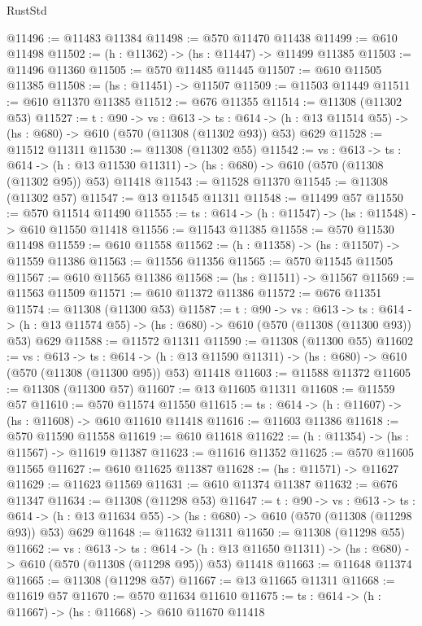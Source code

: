 \begin{lexlean}{RustStd}
\begin{coremodule}
@11496 := @11483 @11384
@11498 := @570 @11470 @11438
@11499 := @610 @11498
@11502 := (h : @11362) -> (hs : @11447) -> @11499 @11385
@11503 := @11496 @11360
@11505 := @570 @11485 @11445
@11507 := @610 @11505 @11385
@11508 := (hs : @11451) -> @11507
@11509 := @11503 @11449
@11511 := @610 @11370 @11385
@11512 := @676 @11355
@11514 := @11308 (@11302 @53)
@11527 := {t : @90} ->
  {vs : @613} ->
  {ts : @614} -> (h : @13 @11514 @55) -> (hs : @680) -> @610 (@570 (@11308 (@11302 @93)) @53) @629
@11528 := @11512 @11311
@11530 := @11308 (@11302 @55)
@11542 := {vs : @613} ->
  {ts : @614} ->
  (h : @13 @11530 @11311) -> (hs : @680) -> @610 (@570 (@11308 (@11302 @95)) @53) @11418
@11543 := @11528 @11370
@11545 := @11308 (@11302 @57)
@11547 := @13 @11545 @11311
@11548 := @11499 @57
@11550 := @570 @11514 @11490
@11555 := {ts : @614} -> (h : @11547) -> (hs : @11548) -> @610 @11550 @11418
@11556 := @11543 @11385
@11558 := @570 @11530 @11498
@11559 := @610 @11558
@11562 := (h : @11358) -> (hs : @11507) -> @11559 @11386
@11563 := @11556 @11356
@11565 := @570 @11545 @11505
@11567 := @610 @11565 @11386
@11568 := (hs : @11511) -> @11567
@11569 := @11563 @11509
@11571 := @610 @11372 @11386
@11572 := @676 @11351
@11574 := @11308 (@11300 @53)
@11587 := {t : @90} ->
  {vs : @613} ->
  {ts : @614} -> (h : @13 @11574 @55) -> (hs : @680) -> @610 (@570 (@11308 (@11300 @93)) @53) @629
@11588 := @11572 @11311
@11590 := @11308 (@11300 @55)
@11602 := {vs : @613} ->
  {ts : @614} ->
  (h : @13 @11590 @11311) -> (hs : @680) -> @610 (@570 (@11308 (@11300 @95)) @53) @11418
@11603 := @11588 @11372
@11605 := @11308 (@11300 @57)
@11607 := @13 @11605 @11311
@11608 := @11559 @57
@11610 := @570 @11574 @11550
@11615 := {ts : @614} -> (h : @11607) -> (hs : @11608) -> @610 @11610 @11418
@11616 := @11603 @11386
@11618 := @570 @11590 @11558
@11619 := @610 @11618
@11622 := (h : @11354) -> (hs : @11567) -> @11619 @11387
@11623 := @11616 @11352
@11625 := @570 @11605 @11565
@11627 := @610 @11625 @11387
@11628 := (hs : @11571) -> @11627
@11629 := @11623 @11569
@11631 := @610 @11374 @11387
@11632 := @676 @11347
@11634 := @11308 (@11298 @53)
@11647 := {t : @90} ->
  {vs : @613} ->
  {ts : @614} -> (h : @13 @11634 @55) -> (hs : @680) -> @610 (@570 (@11308 (@11298 @93)) @53) @629
@11648 := @11632 @11311
@11650 := @11308 (@11298 @55)
@11662 := {vs : @613} ->
  {ts : @614} ->
  (h : @13 @11650 @11311) -> (hs : @680) -> @610 (@570 (@11308 (@11298 @95)) @53) @11418
@11663 := @11648 @11374
@11665 := @11308 (@11298 @57)
@11667 := @13 @11665 @11311
@11668 := @11619 @57
@11670 := @570 @11634 @11610
@11675 := {ts : @614} -> (h : @11667) -> (hs : @11668) -> @610 @11670 @11418

\end{coremodule}
\end{lexlean}
